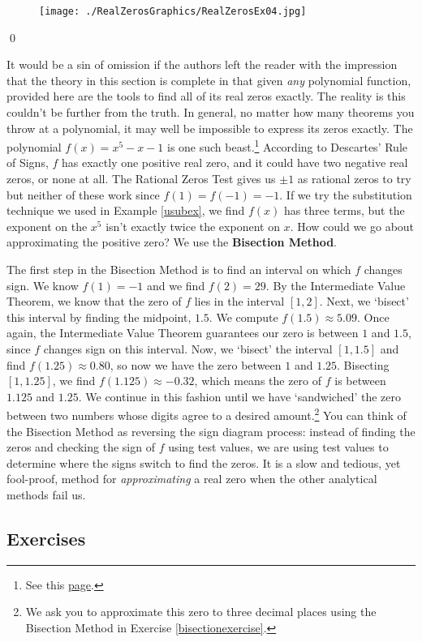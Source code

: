 \begin{ex}
\begin{figure}
\begin{center}
  
\texttt{[image: ./RealZerosGraphics/RealZerosEx04.jpg]}

\caption{}
\label{fig:profitfromlcdtvs}
\end{center}
\end{figure}

 \qed

\end{ex}

It would be a sin of omission if the authors left the reader with the impression that the theory in this section is complete in that given \textit{any} polynomial function, provided here are the tools to find all of its real zeros exactly.  The reality is this couldn't be further from the truth.  In general, no matter how many theorems you throw at a polynomial, it may well be impossible to express its zeros exactly.  The polynomial $f(x) = x^5-x-1$ is one such beast.\footnote{See this \href{http://en.wikipedia.org/wiki/Galois_theory}{\underline{page}}.}  According to Descartes' Rule of Signs, $f$ has exactly one positive real zero, and it could have two negative real zeros, or none at all.  The Rational Zeros Test gives us $\pm 1$ as rational zeros to try but neither of these work since $f(1) = f(-1) = -1$.  If we try the substitution technique we used in Example \ref{usubex}, we find $f(x)$ has three terms, but the exponent on the $x^5$ isn't exactly twice the exponent on $x$.  How could we go about approximating the positive zero?   We use the  \textbf{Bisection Method}.  

\label{bisectionmethod}

The first step in the Bisection Method is to find an interval on which $f$ changes sign.  We know $f(1) = -1$ and we find $f(2) = 29$.  By the Intermediate Value Theorem, we know that the zero of $f$ lies in the interval $[1,2]$.  Next, we `bisect' this interval by finding the midpoint,  $1.5$.  We compute  $f(1.5)\approx 5.09$.  Once again, the Intermediate Value Theorem guarantees our zero is between $1$ and $1.5$, since $f$ changes sign on this interval.  Now, we `bisect' the interval $[1,1.5]$ and find $f(1.25) \approx 0.80$, so now we have the zero between $1$ and $1.25$.  Bisecting $[1,1.25]$, we find $f(1.125) \approx -0.32$, which means the zero of $f$ is between $1.125$ and $1.25$.  We continue in this fashion until we have `sandwiched' the zero between two numbers whose digits agree to a desired amount.\footnote{We ask you to approximate this zero to three decimal places using the Bisection Method  in Exercise \ref{bisectionexercise}.} You can think of the Bisection Method as reversing the sign diagram process:  instead of finding the zeros and checking the sign of $f$ using test values, we are using test values to determine where the signs switch to find the zeros.  It is a slow and tedious, yet fool-proof, method for \textit{approximating} a real zero when the other analytical methods fail us.  


\clearpage

\subsection{Exercises}



\closegraphsfile